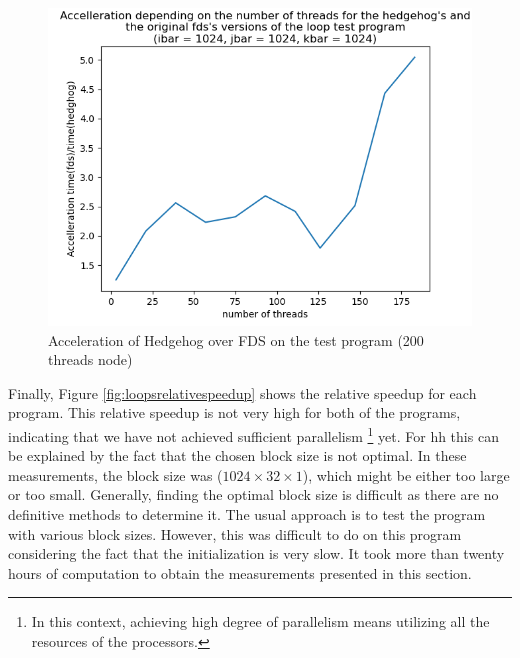 \begin{figure}[ht!]
  \begin{center}
    \includegraphics[scale=0.6]{img/fds-loops/speedup.png}
    \caption{Acceleration of Hedgehog over FDS on the test program (200 threads node)}
    \label{fig:loopsspeedup}
  \end{center}
\end{figure}

Finally, Figure \ref{fig:loopsrelativespeedup} shows the relative speedup for
each program. This relative speedup is not very high for both of the programs,
indicating that we have not achieved sufficient parallelism \footnote{In this
context, achieving high degree of parallelism means utilizing all the resources
of the processors.} yet. For \gls{hh} this can be explained by the fact that the
chosen block size is not optimal. In these measurements, the block size was
($1024\times32\times1$), which might be either too large or too small.
Generally, finding the optimal block size is difficult as there are no
definitive methods to determine it. The usual approach is to test the program
with various block sizes. However, this was difficult to do on this program
considering the fact that the initialization is very slow. It took more than
twenty hours of computation to obtain the measurements presented in this
section.

